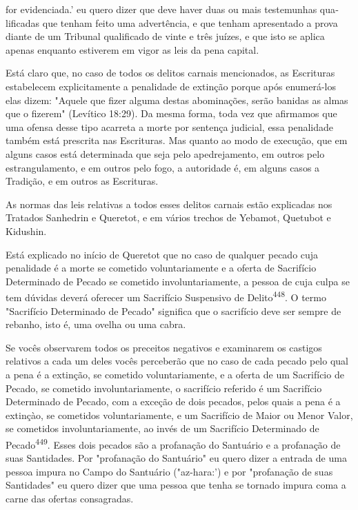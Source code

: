 \begin{itemize}
\begin{enumrate}
\begin{itemize}
\begin{itemize}
\begin{itemize}
for evidenciada.' eu quero dizer que deve haver duas
ou mais testemunhas qua­lificadas que tenham feito uma advertência, e
que tenham apresentado a prova diante de um Tribunal qualificado de
vinte e três juízes, e que isto se aplica apenas enquanto estiverem em
vigor as leis da pena capital.

Está claro que, no caso de todos os delitos carnais mencionados, as
Escrituras estabelecem explicitamente a penalidade de extinção porque
após enumerá-los elas dizem: "Aquele que fizer alguma destas
abominações, serão banidas as almas que o fizerem" (Levítico 18:29). Da
mesma forma, toda vez que afirmamos que uma ofensa desse tipo acarreta a
morte por sentença judi­cial, essa penalidade também está prescrita nas
Escrituras. Mas quanto ao modo de execução, que em alguns casos está
determinada que seja pelo apedrejamento, em outros pelo estrangulamento,
e em outros pelo fogo, a autoridade é, em alguns casos a Tradição, e em
outros as Escrituras.

As normas das leis relativas a todos esses delitos carnais estão
expli­cadas nos Tratados Sanhedrin e Queretot, e em vários trechos de
Yebamot, Que­tubot e Kidushin.

Está explicado no início de Queretot que no caso de qualquer peca­do
cuja penalidade é a morte se cometido voluntariamente e a oferta de
Sacrifí­cio Determinado de Pecado se cometido involuntariamente, a
pessoa de cuja culpa se tem dúvidas deverá oferecer um Sacrifício
Suspensivo de Delito\textsuperscript{448}. O termo "Sacrifício
Determinado de Pecado" significa que o sacrifício deve ser sempre de
rebanho, isto é, uma ovelha ou uma cabra.

Se vocês observarem todos os preceitos negativos e examinarem os
castigos relativos a cada um deles vocês perceberão que no caso de cada
peca­do pelo qual a pena é a extinção, se cometido voluntariamente, e a
oferta de um Sacrifício de Pecado, se cometido involuntariamente, o
sacrifício referido é um Sacrifício Determinado de Pecado, com a exceção
de dois pecados, pelos quais a pena é a extinçào, se cometidos
voluntariamente, e um Sacrifício de Maior ou Menor Valor, se cometidos
involuntariamente, ao invés de um Sacri­fício Determinado de
Pecado\textsuperscript{449}. Esses dois pecados são a profanação do
San­tuário e a profanação de suas Santidades. Por "profanação do
Santuário" eu quero dizer a entrada de uma pessoa impura no Campo do
Santuário ("az-hara:') e por "profanação de suas Santidades" eu quero
dizer que uma pessoa que te­nha se tornado impura coma a carne das
ofertas consagradas.


\end{itemize}
\end{itemize}
\end{itemize}
\end{enumrate}
\end{itemize}
